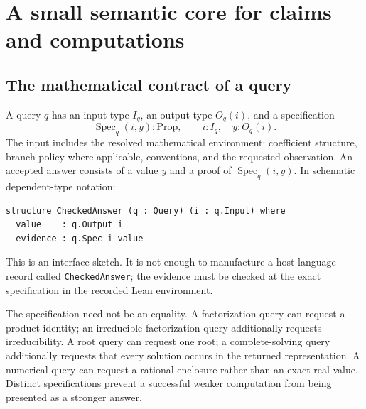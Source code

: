 \documentclass[11pt,a4paper]{article}
\newcommand{\code}[1]{\nolinkurl{#1}}
\newcommand{\Spec}{\operatorname{Spec}}
\theoremstyle{definition}
\begin{document}
\section{A small semantic core for claims and computations}\label{sec:core}

\subsection{The mathematical contract of a query}
A query \(q\) has an input type \(I_q\), an output type \(O_q(i)\), and a specification
\[
  \Spec_q(i,y):\mathrm{Prop},\qquad i:I_q,\quad y:O_q(i).
\]
The input includes the resolved mathematical environment: coefficient structure, branch policy where applicable, conventions, and the requested observation. An accepted answer consists of a value \(y\) and a proof of \(\Spec_q(i,y)\). In schematic dependent-type notation:
\par\noindent\begin{minipage}{\linewidth}
\begin{lstlisting}
structure CheckedAnswer (q : Query) (i : q.Input) where
  value    : q.Output i
  evidence : q.Spec i value
\end{lstlisting}
\end{minipage}\par
This is an interface sketch. It is not enough to manufacture a host-language record called \code{CheckedAnswer}; the evidence must be checked at the exact specification in the recorded Lean environment.

The specification need not be an equality. A factorization query can request a product identity; an irreducible-factorization query additionally requests irreducibility. A root query can request one root; a complete-solving query additionally requests that every solution occurs in the returned representation. A numerical query can request a rational enclosure rather than an exact real value. Distinct specifications prevent a successful weaker computation from being presented as a stronger answer.
\end{document}
